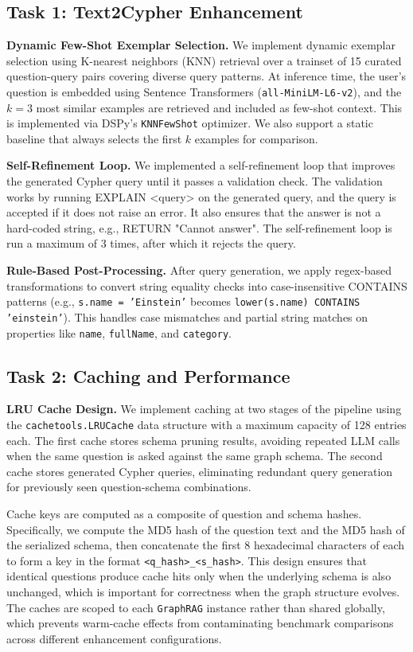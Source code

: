 \documentclass[sigconf]{acmart}
\begin{document}
\subsection{Task 1: Text2Cypher Enhancement}
\label{sec:task1}

\textbf{Dynamic Few-Shot Exemplar Selection.} We implement dynamic exemplar selection using K-nearest neighbors (KNN) retrieval over a trainset of 15 curated question-query pairs covering diverse query patterns. At inference time, the user's question is embedded using Sentence Transformers (\texttt{all-MiniLM-L6-v2}), and the $k=3$ most similar examples are retrieved and included as few-shot context. This is implemented via DSPy's \texttt{KNNFewShot} optimizer. We also support a static baseline that always selects the first $k$ examples for comparison.

\textbf{Self-Refinement Loop.} We implemented a self-refinement loop that improves the generated Cypher query until it passes a validation check. The validation works by running EXPLAIN <query> on the generated query, and the query is accepted if it does not raise an error. It also ensures that the answer is not a hard-coded string, e.g., RETURN "Cannot answer". The self-refinement loop is run a maximum of 3 times, after which it rejects the query.

\textbf{Rule-Based Post-Processing.} After query generation, we apply regex-based transformations to convert string equality checks into case-insensitive CONTAINS patterns (e.g., \texttt{s.name = 'Einstein'} becomes \texttt{lower(s.name) CONTAINS 'einstein'}). This handles case mismatches and partial string matches on properties like \texttt{name}, \texttt{fullName}, and \texttt{category}.

\subsection{Task 2: Caching and Performance}
\label{sec:task2}

\textbf{LRU Cache Design.} We implement caching at two stages of the pipeline using the \texttt{cachetools.LRUCache} data structure with a maximum capacity of 128 entries each. The first cache stores schema pruning results, avoiding repeated LLM calls when the same question is asked against the same graph schema. The second cache stores generated Cypher queries, eliminating redundant query generation for previously seen question-schema combinations.

Cache keys are computed as a composite of question and schema hashes. Specifically, we compute the MD5 hash of the question text and the MD5 hash of the serialized schema, then concatenate the first 8 hexadecimal characters of each to form a key in the format \texttt{<q\_hash>\_<s\_hash>}. This design ensures that identical questions produce cache hits only when the underlying schema is also unchanged, which is important for correctness when the graph structure evolves. The caches are scoped to each \texttt{GraphRAG} instance rather than shared globally, which prevents warm-cache effects from contaminating benchmark comparisons across different enhancement configurations.
\end{document}
